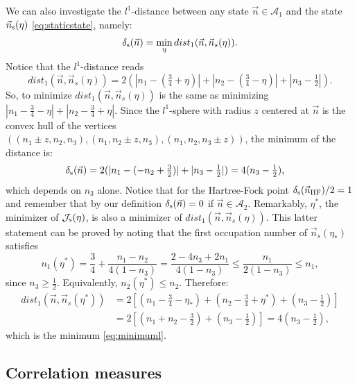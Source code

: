 \documentclass[aps,twocolumn,showpacs,pra,superscriptaddress,floatfix,longbibliography]{revtex4-1}
\newcommand{\7}{\dagger}
\begin{document}
We can also investigate the $l^1$-distance between 
any state $\vec n \in \mathcal{A}_1$ and the state
$\vec n_{\rm s}(\eta)$ \eqref{eq:staticstate}, namely:
\begin{align}
  \label{staticalcorr}
  \delta_{\rm s}(\vec n) = \min_{\eta} dist_1(\vec n, \vec n_s(\eta)).
\end{align}
Notice that the $l^1$-distance reads
$$
dist_1(\vec n, \vec n_s(\eta)) = 2(|n_1 - (\tfrac34 + \eta)|
+  |n_2 - (\tfrac34 - \eta)| +  |n_3 - \tfrac12|).
$$
So, to minimize $dist_1(\vec n, \vec n_s(\eta))$
 is the same as minimizing $|n_1 -\tfrac34 - \eta|
+  |n_2 - \tfrac34 + \eta|$.
Since the $l^1$-sphere with radius $z$
centered at $\vec n$ is the convex hull of the vertices
$((n_1\pm z,n_2,n_3),(n_1,n_2\pm z,n_3),
(n_1,n_2,n_3\pm z))$, the minimum of the distance
is:
\begin{align}
\label{eq:minimuml}
\delta_{\rm s}(\vec n) &= 
 2(|n_1 - (-n_2+\tfrac32)| +  |n_3 - \tfrac12|) 
 =  4(n_3 - \tfrac12),
\end{align}
which depends on $n_3$ alone. Notice that for 
the Hartree-Fock point $\delta_{\rm s}(\vec n_{\rm HF})/2 = 1$
and remember that by our definition 
$\delta_{\rm s}(\vec n) = 0$ if $\vec n \in \mathcal{A}_2$. 
Remarkably, $\eta^{*}$, the minimizer of  $\mathcal{J}_{\rm s}(\eta)$, 
is also a minimizer of $dist_1(\vec n, \vec n_s(\eta))$.
This latter statement can be proved by noting 
that the first occupation number of $\vec n_s(\eta_{*})$ 
satisfies 
$$
n_1(\eta^{*}) = \frac34 +  \frac{n_1 - n_2}{4(1 - n_3)}
= \frac{2 - 4n_3 + 2n_1}{4(1 - n_3)} \leq \frac{n_1}{2(1 - n_3)}
\leq n_1,
$$
since $n_3 \geq \tfrac12$. 
Equivalently, $n_2(\eta^{*}) \leq n_2$.
Therefore:
\begin{align*}
dist_1(\vec n, \vec n_s(\eta^{*})) &= 2[(n_1 - \tfrac34 -  \eta_{*})
+  (n_2 - \tfrac34  + \eta^{*}) + (n_3- \tfrac12)] \\
&= 2[(n_1 + n_2 -  \tfrac32) + (n_3- \tfrac12)] =
4 (n_3- \tfrac12),
\end{align*}
which is the minimum \eqref{eq:minimuml}.

  \subsection{Correlation measures}
   
\end{document}
